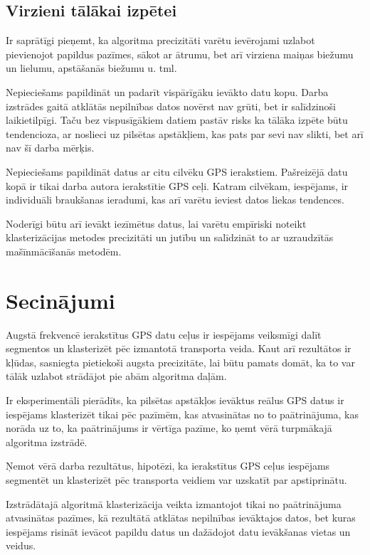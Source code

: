 \documentclass{ludis}
\begin{document}
\section{Virzieni tālākai izpētei}
Ir saprātīgi pieņemt, ka algoritma precizitāti varētu ievērojami uzlabot pievienojot papildus
pazīmes, sākot ar ātrumu, bet arī virziena maiņas biežumu un lielumu, apstāšanās biežumu u. tml.

Nepieciešams papildināt un padarīt vispārīgāku ievākto datu kopu. Darba izstrādes gaitā atklātās
nepilnības datos novērst nav grūti, bet ir salīdzinoši laikietilpīgi. Taču bez vispusīgākiem
datiem pastāv risks ka tālāka izpēte būtu tendencioza, ar noslieci uz pilsētas apstākļiem, kas
pats par sevi nav slikti, bet arī nav šī darba mērķis.

Nepieciešams papildināt datus ar citu cilvēku GPS ierakstiem. Pašreizējā datu kopā ir tikai darba
autora ierakstītie GPS ceļi. Katram cilvēkam, iespējams, ir individuāli braukšanas ieradumi, kas
arī varētu ieviest datos liekas tendences.

Noderīgi būtu arī ievākt iezīmētus datus, lai varētu empīriski noteikt klasterizācijas metodes
precizitāti un jutību un salīdzināt to ar uzraudzītās mašīnmācīšanās metodēm.

\chapter{Secinājumi}
Augstā frekvencē ierakstītus GPS datu ceļus ir iespējams veiksmīgi dalīt segmentos un klasterizēt
pēc izmantotā transporta veida. Kaut arī rezultātos ir kļūdas, sasniegta pietiekoši augsta
precizitāte, lai būtu pamats domāt, ka to var tālāk uzlabot strādājot pie abām algoritma
daļām. 

Ir eksperimentāli pierādīts, ka pilsētas apstākļos ievāktus reālus GPS datus ir iespējams
klasterizēt tikai pēc pazīmēm, kas atvasinātas no to paātrinājuma, kas norāda uz to, ka paātrinājums
ir vērtīga pazīme, ko ņemt vērā turpmākajā algoritma izstrādē.

Ņemot vērā darba rezultātus, hipotēzi, ka ierakstītus GPS ceļus iespējams segmentēt un klasterizēt
pēc transporta veidiem var uzskatīt par apstiprinātu.

Izstrādātajā algoritmā klasterizācija veikta izmantojot tikai no paātrinājuma atvasinātas pazīmes,
kā rezultātā atklātas nepilnības ievāktajos datos, bet kuras iespējams risināt ievācot papildu
datus un dažādojot datu ievākšanas vietas un veidus.

\end{document}
